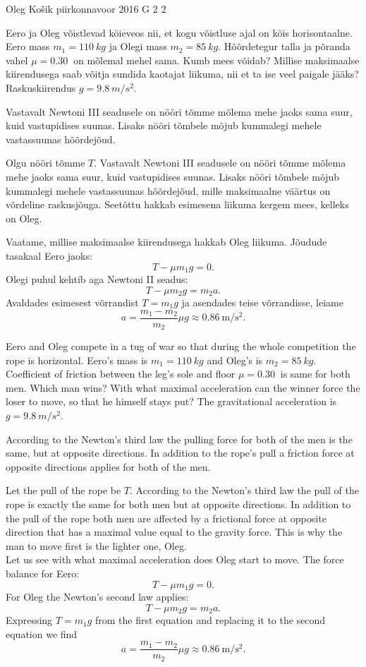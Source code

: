 {Oleg Košik} %
{piirkonnavoor} %
{2016} %
{G 2} %
{2} %
{
\ifStatement
Eero ja Oleg võistlevad köieveos nii, et kogu võistluse ajal on köis horisontaalne. Eero mass $m_1=\SI{110}{kg}$ ja Olegi mass $m_2=\SI{85}{kg}$. Hõõrdetegur talla ja põranda vahel $\mu=\SI{0,30}{}$ on mõlemal mehel sama. Kumb mees võidab? Millise maksimaalse kiirendusega saab võitja sundida kaotajat liikuma, nii et ta ise veel paigale jääks? Raskuskiirendus $g=\SI{9,8}{m/s^2}$.
\fi


\ifHint
Vastavalt Newtoni III seadusele on nööri tõmme mõlema mehe jaoks sama suur, kuid vastupidises suunas. Lisaks nööri tõmbele mõjub kummalegi mehele vastassuunas hõõrdejõud.
\fi


\ifSolution
Olgu nööri tõmme $T$. Vastavalt Newtoni III seadusele on nööri tõmme mõlema mehe jaoks sama suur, kuid vastupidises suunas. Lisaks nööri tõmbele mõjub kummalegi mehele vastassuunas hõõrdejõud, mille maksimaalne väärtus on võrdeline raskusjõuga. Seetõttu hakkab esimesena liikuma kergem mees, kelleks on Oleg.

Vaatame, millise maksimaalse kiirendusega hakkab Oleg liikuma.
Jõudude tasakaal Eero jaoks:
\[
T-\mu m_1g = 0.
\]
Olegi puhul kehtib aga Newtoni II seadus:
\[
T-\mu m_2g = m_2a.
\]
Avaldades esimesest võrrandist $T=m_1g$ ja asendades teise võrrandisse, leiame
\[
a = \frac{m_1-m_2}{m_2}\mu g \approx \SI{0,86}{\meter \per \second\squared}.
\]
\fi


\ifEngStatement
Eero and Oleg compete in a tug of war so that during the whole competition the rope is horizontal. Eero’s mass is $m_1=\SI{110}{kg}$ and Oleg’s is $m_2=\SI{85}{kg}$. Coefficient of friction between the leg’s sole and floor $\mu=\SI{0,30}{}$ is same for both men. Which man wins? With what maximal acceleration can the winner force the loser to move, so that he himself stays put? The gravitational acceleration is $g=\SI{9,8}{m/s^2}$.
\fi


\ifEngHint
According to the Newton’s third law the pulling force for both of the men is the same, but at opposite directions. In addition to the rope’s pull a friction force at opposite directions applies for both of the men.
\fi


\ifEngSolution
Let the pull of the rope be $T$. According to the Newton’s third law the pull of the rope is exactly the same for both men but at opposite directions. In addition to the pull of the rope both men are affected by a frictional force at opposite direction that has a maximal value equal to the gravity force. This is why the man to move first is the lighter one, Oleg.\\
Let us see with what maximal acceleration does Oleg start to move. The force balance for Eero:
\[
T-\mu m_1g = 0.
\]
For Oleg the Newton’s second law applies:
\[
T-\mu m_2g = m_2a.
\]
Expressing $T=m_1g$ from the first equation and replacing it to the second equation we find
\[
a = \frac{m_1-m_2}{m_2}\mu g \approx \SI{0,86}{\meter \per \second\squared}.
\]
\fi
}
